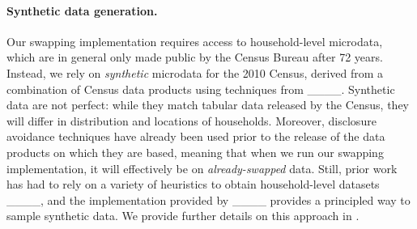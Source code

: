 \paragraph*{Synthetic data generation.}

Our swapping implementation requires access to household-level microdata, which are in general only made public by the Census Bureau after 72 years.
Instead, we rely on \textit{synthetic} microdata for the 2010 Census, derived from a combination of Census data products using techniques from ____.
Synthetic data are not perfect: while they match tabular data released by the Census, they will differ in distribution and locations of households.
Moreover, disclosure avoidance techniques have already been used prior to the release of the data products on which they are based, meaning that when we run our swapping implementation, it will effectively be on \textit{already-swapped} data.
Still, prior work has had to rely on a variety of heuristics to obtain household-level datasets ____, and the implementation provided by ____ provides a principled way to sample synthetic data.
We provide further details on this approach in .